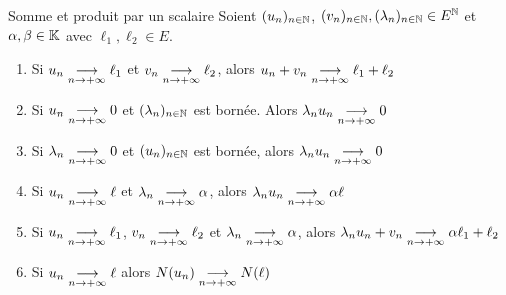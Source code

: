 \begin{proposition}{Somme et produit par un scalaire}{}
    Soient $(u_n)_{n \in \mathbb{N}}$, $(v_n)_{n \in \mathbb{N}}, (\lambda_n) _{n \in \mathbb{N}} \in E^{\mathbb{N}}$ 
    et $\alpha, \beta \in \mathbb{K}$ avec $\ell_1, \ell_2 \in E$. 

    \begin{enumerate}
        \item Si $u_n \underset{n \to +\infty}{\longrightarrow} \ell_1$ et $v_n \underset{n \to +\infty}{\longrightarrow} \ell_2$, alors 
            $u_n + v_n \underset{n \to +\infty}{\longrightarrow} \ell_1 + \ell_2$ 
        \item Si $u_n \underset{n \to +\infty}{\longrightarrow} 0$ et $(\lambda_n)_{n \in \mathbb{N}} $ est bornée. 
            Alors $\lambda_n u_n \underset{n \to +\infty}{\longrightarrow} 0$
        \item Si $\lambda_n \underset{n \to +\infty}{\longrightarrow} 0$ et $(u_n)_{n \in \mathbb{N}}$ est bornée, 
            alors $\lambda_n u_n \underset{n \to +\infty}{\longrightarrow} 0$
        \item Si $u_n \underset{n \to +\infty}{\longrightarrow} \ell$ et $\lambda_n \underset{n \to +\infty}{\longrightarrow} \alpha$, alors
            $\lambda_n u_n \underset{n \to +\infty}{\longrightarrow} \alpha \ell$
        \item Si $u_n \underset{n \to +\infty}{\longrightarrow} \ell_1$, $v_n \underset{n \to +\infty}{\longrightarrow} \ell_2$ 
            et $\lambda_n \underset{n \to +\infty}{\longrightarrow} \alpha$, alors
            $\lambda_n u_n + v_n \underset{n \to +\infty}{\longrightarrow} \alpha \ell_1 + \ell_2$
        \item Si $u_n \underset{n \to +\infty}{\longrightarrow} \ell$ alors $N(u_n) \underset{n \to +\infty}{\longrightarrow} N(\ell)$
    \end{enumerate}

\end{proposition}



